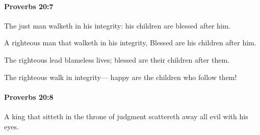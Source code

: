 		\paragraph{Proverbs 20:7} %
			\label{PROVERBS-20-7}

			The just man walketh in his integrity: his children are blessed after him.

			\begin{versebox}
					\item[BHS] 
					\item[ASV] A righteous man that walketh in his integrity, Blessed are his children after him.
					\item[NIV] The righteous lead blameless lives; blessed are their children after them.
					\item[NRSV] The righteous walk in integrity— happy are the children who follow them!
			\end{versebox}

		\paragraph{Proverbs 20:8} %
			\label{PROVERBS-20-8}

			A king that sitteth in the throne of judgment scattereth away all evil with his eyes.

